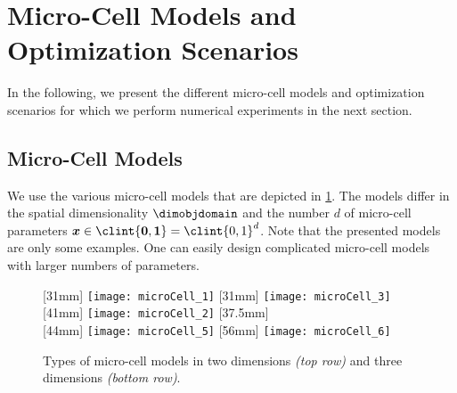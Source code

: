 \section{Micro-Cell Models and Optimization Scenarios}
\label{sec:63models}


\noindent
In the following, we present the different micro-cell models
and optimization scenarios for which we perform numerical
experiments in the next section.



\subsection{Micro-Cell Models}
\label{sec:631models}

We use the various micro-cell models that are depicted in \cref{fig:microCell}.
The models differ in the spatial dimensionality $\dimobjdomain$
and the number $d$ of micro-cell parameters
$\*x \in \clint{\*0, \*1} = \clint{0, 1}^d$.
Note that the presented models are only some examples.
One can easily design complicated micro-cell models
with larger numbers of parameters.

\begin{figure}
  [31mm]{%
    \texttt{[image: microCell\_1]}%
  }%
  \hfill%
  [31mm]{%
    \texttt{[image: microCell\_3]}%
  }%
  \hfill%
  [41mm]{%
    \texttt{[image: microCell\_2]}%
  }%
  \hfill%
  [37.5mm]{%
    \hspace*{-45mm}%
  }\\[2mm]%
  [44mm]{%
    \texttt{[image: microCell\_5]}%
  }%
  \quad%
  [56mm]{%
    \hspace*{5mm}%
    \texttt{[image: microCell\_6]}%
  }%
  \caption[Types of micro-cell models]{%
    Types of micro-cell models in two dimensions \emph{(top row)}
    and three dimensions \emph{(bottom row)}.%
  }%
  \label{fig:microCell}%
\end{figure}

